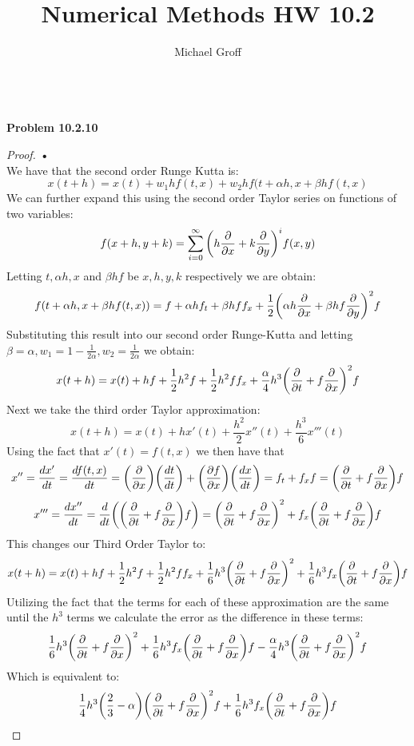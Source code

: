 \documentclass[12pt]{article}
\begin{document}
\title{Numerical Methods HW 10.2}
\author{Michael Groff 
}
\maketitle
\text{ }\\
\textbf{Problem 10.2.10}

\begin{proof}
\textbf{•}\\
We have that the second order Runge Kutta is: \[ x(t +h) = x(t)+w_1 h f(t,x)+w_2 h f(t +\alpha h,x + \beta h f(t,x) \]
We can further expand this using the second order Taylor series on functions of two variables:
\[ f(x+ h, y+ k) = \sum_{i=0}^{\infty} \bigg{(} h \frac{\partial}{\partial x} + k \frac{\partial}{\partial y} \bigg{)}^i f(x,y)\]
Letting $t , \alpha h, x$ and $\beta h f$ be $x,h,y,k$ respectively we are obtain: 
\[ f(t +\alpha h,x + \beta h f(t,x)) = f + \alpha h f_t + \beta h f f_x + \frac{1}{2} \bigg{(} \alpha h \frac{\partial}{\partial x} + \beta h f \frac{\partial}{\partial y} \bigg{)}^2 f \]
Substituting this result into our second order Runge-Kutta and letting $\beta = \alpha, w_1 = 1- \frac{1}{2 \alpha} , w_2 = \frac{1}{2 \alpha} $ we obtain:
\[x(t+h) = x(t) + hf + \frac{1}{2} h^2 f + \frac{1}{2} h^2 f f_x + \frac{\alpha}{4} h^3 \bigg{(}  \frac{\partial}{\partial t} +  f \frac{\partial}{\partial x} \bigg{)}^2 f\]
Next we take the third order Taylor approximation:
\[x(t+h) = x(t) + h x'(t) + \frac{h^2}{2} x''(t)+\frac{h^3}{6} x'''(t)\]
Using the fact that $x'(t) = f(t,x)$ we then have that
\[ x'' = \frac{d x'}{dt} = \frac{d f(t,x) }{dt} = \bigg{(} \frac{\partial}{\partial x} \bigg{)} \bigg{(} \frac{dt}{dt} \bigg{)}  + \bigg{(} \frac{\partial f}{\partial x} \bigg{)} \bigg{(} \frac{dx}{dt} \bigg{)} = f_t + f_x f = \bigg{(}  \frac{\partial}{\partial t} +  f \frac{\partial}{\partial x} \bigg{)} f\]
\[ x''' = \frac{d x''}{dt} = \frac{d}{dt} \bigg{(} \bigg{(}  \frac{\partial}{\partial t} +  f \frac{\partial}{\partial x} \bigg{)} f \bigg{)} = \bigg{(}   \frac{\partial}{\partial t} +  f \frac{\partial}{\partial x}  \bigg{)}^2 + f_x \bigg{(}   \frac{\partial}{\partial t} +  f \frac{\partial}{\partial x}  \bigg{)} f \]
This changes our Third Order Taylor to: 
\[x(t+h) = x(t) + hf + \frac{1}{2} h^2 f + \frac{1}{2} h^2 f f_x + \frac{1}{6} h^3 \bigg{(}   \frac{\partial}{\partial t} +  f \frac{\partial}{\partial x}  \bigg{)}^2 + \frac{1}{6} h^3 f_x \bigg{(}   \frac{\partial}{\partial t} +  f \frac{\partial}{\partial x}  \bigg{)} f  \]
Utilizing the fact that the terms for each of these approximation are the same until the $h^3$ terms we calculate the error as the difference in these terms:
\[ \frac{1}{6} h^3 \bigg{(}   \frac{\partial}{\partial t} +  f \frac{\partial}{\partial x}  \bigg{)}^2 + \frac{1}{6} h^3 f_x \bigg{(}   \frac{\partial}{\partial t} +  f \frac{\partial}{\partial x}  \bigg{)} f -  \frac{\alpha}{4} h^3 \bigg{(}  \frac{\partial}{\partial t} +  f \frac{\partial}{\partial x} \bigg{)}^2 f\]
Which is equivalent to:
\[\frac{1}{4} h^3 \bigg{(} \frac{2}{3} - \alpha  \bigg{)} \bigg{(}  \frac{\partial}{\partial t} +  f \frac{\partial}{\partial x} \bigg{)}^2 f + \frac{1}{6} h^3 f_x \bigg{(}   \frac{\partial}{\partial t} +  f \frac{\partial}{\partial x}  \bigg{)} f\]



\end{proof}
\end{document}
